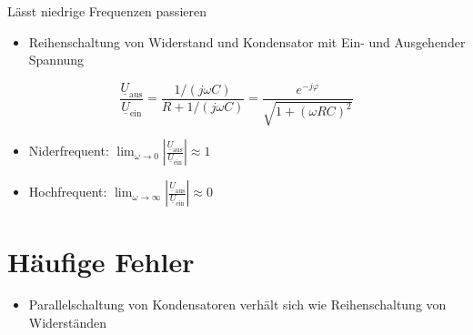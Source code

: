 Lässt niedrige Frequenzen passieren

\begin{itemize}
  \item Reihenschaltung von Widerstand und Kondensator mit Ein- und Ausgehender Spannung
\end{itemize}

$$\frac{\underline{U}_\text{aus}}{\underline{U}_\text{ein}} = \frac{1 / (j \omega C)}{R + 1/(j \omega C)} = \frac{e^{-j \varphi}}{\sqrt{1 + (\omega R C)^2}}$$

\begin{itemize}
  \item Niderfrequent: $\lim_{\omega \rightarrow 0} \left|\frac{\underline{U}_\text{aus}}{\underline{U}_\text{ein}}\right| \approx 1$
  \item Hochfrequent: $\lim_{\omega \rightarrow \infty} \left|\frac{\underline{U}_\text{aus}}{\underline{U}_\text{ein}}\right| \approx 0$
\end{itemize}

\section{Häufige Fehler}

\begin{itemize}
  \item Parallelschaltung von Kondensatoren verhält sich wie Reihenschaltung von Widerständen
\end{itemize}